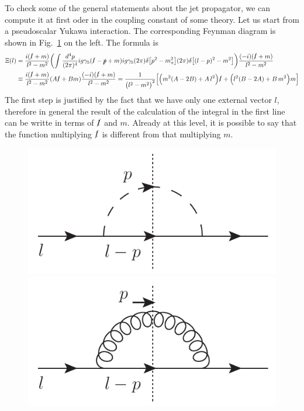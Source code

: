\documentclass[preprintnumbers,floatfix,nofootinbib]{revtex4}
\begin{document}
To check some of the general statements about the jet propagator, we can
compute it at first oder in the coupling constant of some theory. 
Let us start
from a pseudoscalar Yukawa interaction. The corresponding Feynman diagram is
shown in Fig.~\ref{fig:selfen} on the left. 
The formula is
\begin{equation}
\begin{split} 
\Xi(l) &= \frac{i (\slashed{l} +m)}{l^2 - m^2}
\biggl(\int \frac{d^4 p}{(2 \pi)^4} i g \gamma_5
 (\slashed{l}-\slashed{p} +m) i g \gamma_5 
(2 \pi ) \delta \bigl[p^2 - m_{\pi}^2\bigr]
(2 \pi) \delta\bigl[(l-p)^2 - m^2\bigr] \biggr)
\frac{(-i) (\slashed{l} +m)}{l^2 - m^2}
\\
&\equiv
\frac{i (\slashed{l} +m)}{l^2 - m^2}
(A \slashed{l} + B m) 
\frac{(-i) (\slashed{l} +m)}{l^2 - m^2}
=
\frac{1}{\bigl(l^2 - m^2\bigr)^2}
\Bigl[\Bigl(m^2 (A-2B) +  A\, l^2 \Bigr) \slashed{l} 
+
\Bigl(l^2 (B-2A) +  B\, m^2 \Bigr) m \Bigr] 
\end{split} 
\end{equation} 
The first step is justified by the fact that we have only one external 
vector $l$, therefore in general the result of the calculation of the integral
in the first line can be writte in terms of
$\slashed{l}$ and $m$. 
Already at this level, it is possible to say that the function 
multiplying $\slashed{l}$ is different from that multiplying $m$. 

\begin{figure}
  \centering
  \includegraphics[width=0.3\linewidth]{selfen_cut}
  \hfil
  \includegraphics[width=0.3\linewidth]{selfen_gluon_cut}
  \caption{
  }
  \label{fig:selfen}
\end{figure}
\end{document}
